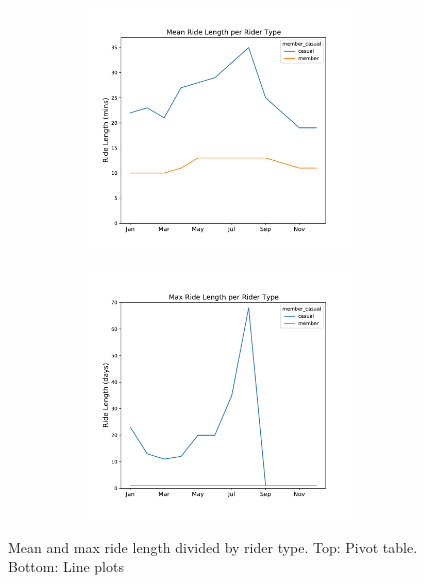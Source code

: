 \documentclass[12pt]{article}
\begin{document}
\begin{figure}[h]
		\begin{subfigure}[b]{0.55\textwidth}
			\hspace{-1.5in}
   			\begin{subfigure}{.45\textwidth}
				\includegraphics[scale=0.5]{mean_ridelength_line.pdf} 
				\caption{}
				\label{fig11_2_1}
			\end{subfigure}
			\hspace{1.5in}
			\begin{subfigure}{.4\textwidth}
				\includegraphics[scale=0.5]{max_ridelength_line.pdf} 
				\caption{}
				\label{fig11_2_2}
			\end{subfigure}
		\end{subfigure}
		\caption{Mean and max ride length divided by rider type. Top: Pivot table. Bottom: Line plots}
		\label{fig11}
	\end{figure}
\end{document}
